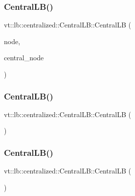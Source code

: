 \subsubsection{\texorpdfstring{Central\+L\+B()}{CentralLB()}\hspace{0.1cm}{\footnotesize\ttfamily [1/3]}}
{\footnotesize\ttfamily vt\+::lb\+::centralized\+::\+Central\+L\+B\+::\+Central\+LB (\begin{DoxyParamCaption}\item[{\hyperlink{namespacevt_a866da9d0efc19c0a1ce79e9e492f47e2}{Node\+Type} const \&}]{node,  }\item[{\hyperlink{namespacevt_a866da9d0efc19c0a1ce79e9e492f47e2}{Node\+Type} const \&}]{central\+\_\+node }\end{DoxyParamCaption})\hspace{0.3cm}{\ttfamily [inline]}}

\mbox{\label{structvt_1_1lb_1_1centralized_1_1_central_l_b_aa0fcbec516d85fc7fbdfe2ac436d3dc7}} 
\subsubsection{\texorpdfstring{Central\+L\+B()}{CentralLB()}\hspace{0.1cm}{\footnotesize\ttfamily [2/3]}}
{\footnotesize\ttfamily vt\+::lb\+::centralized\+::\+Central\+L\+B\+::\+Central\+LB (\begin{DoxyParamCaption}\item[{\hyperlink{structvt_1_1lb_1_1centralized_1_1_central_l_b}{Central\+LB} const \&}]{ }\end{DoxyParamCaption})\hspace{0.3cm}{\ttfamily [delete]}}

\mbox{\label{structvt_1_1lb_1_1centralized_1_1_central_l_b_a90c17141afbb48c0765891bad941a5cc}} 
\subsubsection{\texorpdfstring{Central\+L\+B()}{CentralLB()}\hspace{0.1cm}{\footnotesize\ttfamily [3/3]}}
{\footnotesize\ttfamily vt\+::lb\+::centralized\+::\+Central\+L\+B\+::\+Central\+LB (\begin{DoxyParamCaption}\item[{\hyperlink{structvt_1_1lb_1_1centralized_1_1_central_l_b}{Central\+LB} \&\&}]{ }\end{DoxyParamCaption})\hspace{0.3cm}{\ttfamily [delete]}}



